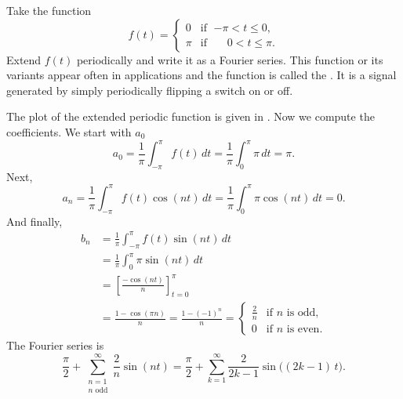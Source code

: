 \begin{example}
Take the function
\begin{equation*}
f(t) =
\begin{cases}
0 & \text{if } \;{-\pi} < t \leq 0 , \\
\pi & \text{if } \;\phantom{-}0 < t \leq \pi .
\end{cases}
\end{equation*}
\nopagebreak[4]%
Extend $f(t)$ periodically and write it 
as a Fourier series.  This function or its variants appear often
in applications and the function is called the
\emph{}.  It is a signal
generated by simply periodically flipping a switch on or off.

\begin{myfig}
\capstart
{}
\caption{The graph of the square wave function.\label{ts:squarewavefig}}
\end{myfig}

\pagebreak[2]
The plot of the extended periodic function is given in
.
Now we compute the coefficients.  We start with $a_0$
\begin{equation*}
a_0 = \frac{1}{\pi} \int_{-\pi}^\pi f(t) \,dt
= \frac{1}{\pi} \int_{0}^\pi \pi \,dt = \pi .
\end{equation*}
Next,
\begin{equation*}
a_n = \frac{1}{\pi} \int_{-\pi}^\pi f(t) \cos (nt) \,dt 
= \frac{1}{\pi} \int_{0}^\pi \pi \cos (nt) \,dt = 0 .
\end{equation*}
And finally,
\begin{equation*}
\begin{split}
b_n & = \frac{1}{\pi} \int_{-\pi}^\pi f(t) \sin (nt) \,dt \\
& = \frac{1}{\pi} \int_{0}^\pi \pi \sin (nt) \,dt \\
& = \left[ \frac{- \cos (nt)}{n} \right]_{t=0}^\pi \\
& = \frac{1 - \cos (\pi n)}{n}
= \frac{1 - {(-1)}^n}{n}
=
\begin{cases}
\frac{2}{n} & \text{if } n \text{ is odd} , \\
0 & \text{if } n \text{ is even} .
\end{cases}
\end{split}
\end{equation*}
The Fourier series is
\begin{equation*}
\frac{\pi}{2} +  \sum_{\substack{n=1\\n \text{ odd}}}^\infty
\frac{2}{n} 
\sin (n t)
=
\frac{\pi}{2} + \sum_{k=1}^\infty
\frac{2}{2k-1} 
\sin \bigl( (2k-1)\, t \bigr) .
\end{equation*}


\end{example}
